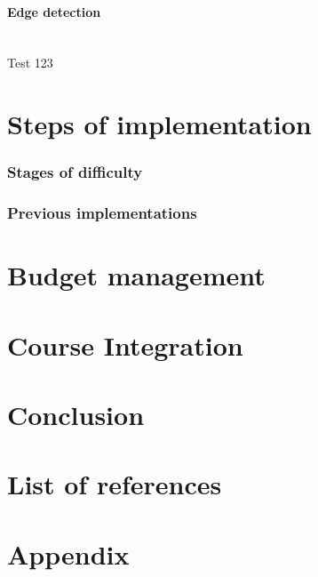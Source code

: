 \documentclass[11pt]{article}
\begin{document}
\paragraph{Edge detection}\mbox{}\\
Test 123

\section{Steps of implementation}

\subsubsection{Stages of difficulty}

\subsubsection{Previous implementations}

\section{Budget management}

\section{Course Integration}

\section{Conclusion}

\section{List of references}

\section{Appendix}
\end{document}
